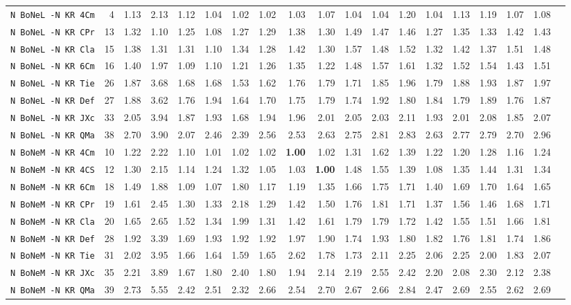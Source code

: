 \begin{tabular}{l | r @{~~} r | r@{~~}r@{~~}r@{~~}r@{~~}r@{~~}r@{~~}r@{~~}r@{~~}r@{~~}r@{~~}r@{~~}r@{~~}r@{~~}r@{~~}r@{~~}r|}
\verb+N BoNeL -N KR 4Cm+ & 4 & 1.13 & 2.13&1.12&1.04&1.02&1.02&1.03&1.07&1.04&1.04&1.20&1.04&1.13&1.19&1.07&1.08\\
\verb+N BoNeL -N KR CPr+ & 13 & 1.32 & 1.10&1.25&1.08&1.27&1.29&1.38&1.30&1.49&1.47&1.46&1.27&1.35&1.33&1.42&1.43\\
\verb+N BoNeL -N KR Cla+ & 15 & 1.38 & 1.31&1.31&1.10&1.34&1.28&1.42&1.30&1.57&1.48&1.52&1.32&1.42&1.37&1.51&1.48\\
\verb+N BoNeL -N KR 6Cm+ & 16 & 1.40 & 1.97&1.09&1.10&1.21&1.26&1.35&1.22&1.48&1.57&1.61&1.32&1.52&1.54&1.43&1.51\\
\verb+N BoNeL -N KR Tie+ & 26 & 1.87 & 3.68&1.68&1.68&1.53&1.62&1.76&1.79&1.71&1.85&1.96&1.79&1.88&1.93&1.87&1.97\\
\verb+N BoNeL -N KR Def+ & 27 & 1.88 & 3.62&1.76&1.94&1.64&1.70&1.75&1.79&1.74&1.92&1.80&1.84&1.79&1.89&1.76&1.87\\
\verb+N BoNeL -N KR JXc+ & 33 & 2.05 & 3.94&1.87&1.93&1.68&1.94&1.96&2.01&2.05&2.03&2.11&1.93&2.01&2.08&1.85&2.07\\
\verb+N BoNeL -N KR QMa+ & 38 & 2.70 & 3.90&2.07&2.46&2.39&2.56&2.53&2.63&2.75&2.81&2.83&2.63&2.77&2.79&2.70&2.96\smallskip \\
\verb+N BoNeM -N KR 4Cm+ & 10 & 1.22 & 2.22&1.10&1.01&1.02&1.02&\textbf{1.00}&1.02&1.31&1.62&1.39&1.22&1.20&1.28&1.16&1.24\\
\verb+N BoNeM -N KR 4CS+ & 12 & 1.30 & 2.15&1.14&1.24&1.32&1.05&1.03&\textbf{1.00}&1.48&1.55&1.39&1.08&1.35&1.44&1.31&1.34\\
\verb+N BoNeM -N KR 6Cm+ & 18 & 1.49 & 1.88&1.09&1.07&1.80&1.17&1.19&1.35&1.66&1.75&1.71&1.40&1.69&1.70&1.64&1.65\\
\verb+N BoNeM -N KR CPr+ & 19 & 1.61 & 2.45&1.30&1.33&2.18&1.29&1.42&1.50&1.76&1.81&1.71&1.37&1.56&1.46&1.68&1.71\\
\verb+N BoNeM -N KR Cla+ & 20 & 1.65 & 2.65&1.52&1.34&1.99&1.31&1.42&1.61&1.79&1.79&1.72&1.42&1.55&1.51&1.66&1.81\\
\verb+N BoNeM -N KR Def+ & 28 & 1.92 & 3.39&1.69&1.93&1.92&1.92&1.97&1.90&1.74&1.93&1.80&1.82&1.76&1.81&1.74&1.86\\
\verb+N BoNeM -N KR Tie+ & 31 & 2.02 & 3.95&1.66&1.64&1.59&1.65&2.62&1.78&1.73&2.11&2.25&2.06&2.25&2.00&1.83&2.07\\
\verb+N BoNeM -N KR JXc+ & 35 & 2.21 & 3.89&1.67&1.80&2.40&1.80&1.94&2.14&2.19&2.55&2.42&2.20&2.08&2.30&2.12&2.38\\
\verb+N BoNeM -N KR QMa+ & 39 & 2.73 & 5.55&2.42&2.51&2.32&2.66&2.54&2.70&2.67&2.66&2.84&2.47&2.69&2.55&2.62&2.69\smallskip \\

\end{tabular}
